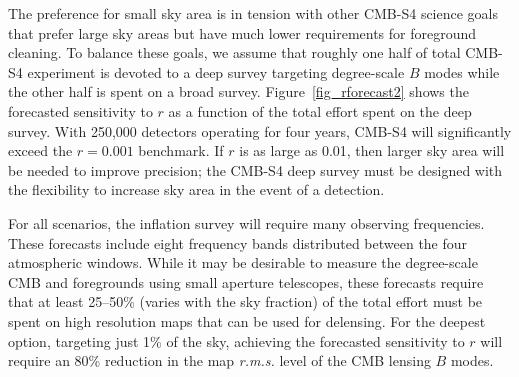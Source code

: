 The preference for small sky area is in tension with other CMB-S4 science goals that prefer large sky areas but have much lower requirements for foreground cleaning.
To balance these goals, we assume that roughly one half of total CMB-S4 experiment is devoted to a deep survey targeting degree-scale $B$ modes while the other half is spent on a broad survey.
Figure~\ref{fig_rforecast2} shows the forecasted sensitivity to $r$ as a function of the total effort spent on the deep survey.
With 250,000 detectors operating for four years, CMB-S4 will significantly exceed the $r=0.001$ benchmark.
If $r$ is as large as 0.01, then larger sky area will be needed to improve precision; the CMB-S4 deep survey must be designed with the flexibility to increase sky area in the event of a detection.

For all scenarios, the inflation survey will require many observing frequencies.
These forecasts include eight frequency bands distributed between the four atmospheric windows.
While it may be desirable to measure the degree-scale CMB and foregrounds using small aperture telescopes, these forecasts require that at least 25--50\% (varies with the sky fraction) of the total effort must be spent on high resolution maps that can be used for delensing.
For the deepest option, targeting just 1\% of the sky, achieving the forecasted sensitivity to $r$ will require an 80\% reduction in the map {\it r.m.s.} level of the CMB lensing $B$ modes.

